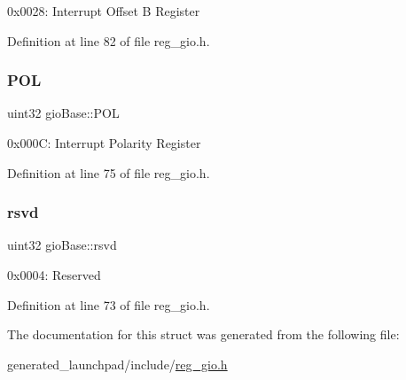 0x0028\+: Interrupt Offset B Register 

Definition at line 82 of file reg\+\_\+gio.\+h.

\mbox{\label{structgioBase_a50608ea9dd682b4469235370ec534efc}} 
\subsubsection{\texorpdfstring{P\+OL}{POL}}
{\footnotesize\ttfamily uint32 gio\+Base\+::\+P\+OL}

0x000C\+: Interrupt Polarity Register 

Definition at line 75 of file reg\+\_\+gio.\+h.

\mbox{\label{structgioBase_a9c230d342103baff11e8098e61649191}} 
\subsubsection{\texorpdfstring{rsvd}{rsvd}}
{\footnotesize\ttfamily uint32 gio\+Base\+::rsvd}

0x0004\+: Reserved 

Definition at line 73 of file reg\+\_\+gio.\+h.



The documentation for this struct was generated from the following file\+:\begin{DoxyCompactItemize}
\item 
generated\+\_\+launchpad/include/\mbox{\hyperlink{reg__gio_8h}{reg\+\_\+gio.\+h}}\end{DoxyCompactItemize}
